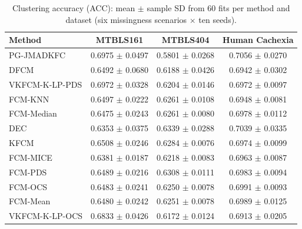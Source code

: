 \begin{table}[t]
\centering
\caption{Clustering accuracy (ACC): mean $\pm$ sample SD from 60 fits per method and dataset (six missingness scenarios $\times$ ten seeds).}
\label{tab:supp_acc}
\small
\setlength{\tabcolsep}{5pt}
\begin{tabular}{lccc}
\toprule
Method & MTBLS161 & MTBLS404 & Human Cachexia \\
\midrule
PG-JMADKFC & 0.6975 $\pm$ 0.0497 & 0.5801 $\pm$ 0.0268 & 0.7056 $\pm$ 0.0270 \\
DFCM & 0.6492 $\pm$ 0.0680 & 0.6188 $\pm$ 0.0426 & 0.6942 $\pm$ 0.0302 \\
VKFCM-K-LP-PDS & 0.6972 $\pm$ 0.0328 & 0.6204 $\pm$ 0.0146 & 0.6972 $\pm$ 0.0097 \\
FCM-KNN & 0.6497 $\pm$ 0.0222 & 0.6261 $\pm$ 0.0108 & 0.6948 $\pm$ 0.0081 \\
FCM-Median & 0.6475 $\pm$ 0.0243 & 0.6261 $\pm$ 0.0080 & 0.6978 $\pm$ 0.0112 \\
DEC & 0.6353 $\pm$ 0.0375 & 0.6339 $\pm$ 0.0288 & 0.7039 $\pm$ 0.0335 \\
KFCM & 0.6508 $\pm$ 0.0246 & 0.6284 $\pm$ 0.0076 & 0.6974 $\pm$ 0.0099 \\
FCM-MICE & 0.6381 $\pm$ 0.0187 & 0.6218 $\pm$ 0.0083 & 0.6963 $\pm$ 0.0087 \\
FCM-PDS & 0.6489 $\pm$ 0.0216 & 0.6308 $\pm$ 0.0111 & 0.6983 $\pm$ 0.0094 \\
FCM-OCS & 0.6483 $\pm$ 0.0241 & 0.6250 $\pm$ 0.0078 & 0.6991 $\pm$ 0.0093 \\
FCM-Mean & 0.6480 $\pm$ 0.0242 & 0.6251 $\pm$ 0.0078 & 0.6989 $\pm$ 0.0125 \\
VKFCM-K-LP-OCS & 0.6833 $\pm$ 0.0426 & 0.6172 $\pm$ 0.0124 & 0.6913 $\pm$ 0.0205 \\
\bottomrule
\end{tabular}
\end{table}

